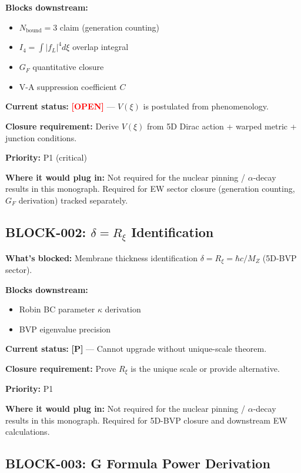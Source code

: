 \documentclass[11pt,a4paper]{article}
\newcommand{\tagP}{\textcolor{red!70!black}{\textbf{[P]}}}
\newcommand{\tagOPEN}{\textcolor{red}{\textbf{[OPEN]}}}
\begin{document}
\textbf{Blocks downstream:}
\begin{itemize}[nosep]
    \item $N_{\text{bound}} = 3$ claim (generation counting)
    \item $I_4 = \int |f_L|^4 d\xi$ overlap integral
    \item $G_F$ quantitative closure
    \item V-A suppression coefficient $C$
\end{itemize}

\textbf{Current status:} \tagOPEN{} --- $V(\xi)$ is postulated from phenomenology.

\textbf{Closure requirement:} Derive $V(\xi)$ from 5D Dirac action + warped metric + junction conditions.

\textbf{Priority:} P1 (critical)

\textbf{Where it would plug in:} Not required for the nuclear pinning / $\alpha$-decay results in this monograph. Required for EW sector closure (generation counting, $G_F$ derivation) tracked separately.

\subsection{BLOCK-002: $\delta = R_\xi$ Identification}
\label{sec:L2}

\textbf{What's blocked:} Membrane thickness identification $\delta = R_\xi = \hbar c / M_Z$ (5D-BVP sector).

\textbf{Blocks downstream:}
\begin{itemize}[nosep]
    \item Robin BC parameter $\kappa$ derivation
    \item BVP eigenvalue precision
\end{itemize}

\textbf{Current status:} \tagP{} --- Cannot upgrade without unique-scale theorem.

\textbf{Closure requirement:} Prove $R_\xi$ is the unique scale or provide alternative.

\textbf{Priority:} P1

\textbf{Where it would plug in:} Not required for the nuclear pinning / $\alpha$-decay results in this monograph. Required for 5D-BVP closure and downstream EW calculations.

\subsection{BLOCK-003: G Formula Power Derivation}
\label{sec:L3}
\end{document}
